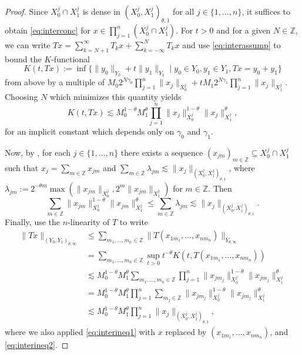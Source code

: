 \documentclass{amsart}
\numberwithin{equation}{section}
\theoremstyle{definition}
\newcommand{\Z}{\mathbb{Z}}
\newcommand {\la}{\lambda}
\begin{document}
\begin{proof}

Since $X_{0}^{j}\cap X_{1}^{j}$ is dense in $(X_{0}^{j},X_{1}^{j})_{\theta,1}$ for all $j\in\{1,\ldots,n\}$, it suffices to obtain \eqref{eq:interconc} for $x\in \prod_{j=1}^{n}(X_{0}^{j}\cap X_{1}^{j})$. For $t>0$ and for a given $N\in\Z$, we can write $Tx=\sum_{k=N+1}^{\infty}T_{k}x+\sum_{k=-\infty}^{N}T_{k}x$ and use \eqref{eq:interassump} to bound the $K$-functional 
\[
K(t,Tx):=\inf\{\|y_{0}\|_{Y_{0}}+t\|y_{1}\|_{Y_{1}}\mid y_{0}\in Y_{0},y_{1}\in Y_{1}, Tx=y_{0}+y_{1}\}
\]
from above by a multiple of $M_{0}2^{N\gamma_{0}}\prod_{j=1}^{n}\|x_{j}\|_{X^{j}_{0}}+tM_{1}2^{N\gamma_{1}}\prod_{j=1}^{n}\|x_{j}\|_{X^{j}_{1}}$. Choosing $N$ which minimizes this quantity yields
\begin{equation}\label{eq:interineq1}
K(t,Tx)\lesssim M_{0}^{1-\theta}M_{1}^{\theta}\prod_{j=1}^{n}\|x_{j}\|_{X^{j}_{0}}^{1-\theta}\|x_{j}\|_{X^{j}_{1}}^{\theta},
\end{equation}
for an implicit constant which depends only on $\gamma_{0}$ and $\gamma_{1}$.

Now, by \cite[Lemma 3.2.3 and Theorem 3.3.1]{Bergh-Lofstrom76}, for each $j\in\{1,\ldots,n\}$ there exists a sequence $(x_{jm})_{m\in\Z}\subseteq X_{0}^{j}\cap X^{j}_{1}$ such that $x_{j}=\sum_{m\in\Z}x_{jm}$ and $\sum_{m\in\Z}\la_{jm}\lesssim \|x_{j}\|_{(X_{0}^{j},X_{1}^{j})_{\theta,1}}$, where $\lambda_{jm}:=2^{-\theta m}\max(\|x_{jm}\|_{X^{j}_{0}},2^{m}\|x_{jm}\|_{X_{1}^{j}})$ for $m\in\Z$. Then 
\begin{equation}\label{eq:interineq2}
\sum_{m\in\Z}\|x_{jm}\|_{X^{j}_{0}}^{1-\theta}\|x_{jm}\|_{X^{j}_{1}}^{\theta}\leq \sum_{m\in\Z}\la_{jm}\lesssim \|x_{j}\|_{(X_{0}^{j},X_{1}^{j})_{\theta,1}}.
\end{equation}
Finally, use the $n$-linearity of $T$ to write
\begin{align*}
\|Tx\|_{(Y_{0},Y_{1})_{\theta,\infty}}&\leq \sum_{m_{1},\ldots,m_{n}\in\Z}\|T(x_{1m_{1}},\ldots,x_{nm_{n}})\|_{\overline{Y}_{\theta,\infty}}\\
&=\sum_{m_{1},\ldots,m_{n}\in\Z}\sup_{t>0}t^{-\theta}K(t,T(x_{1m_{1}},\ldots,x_{nm_{n}}))\\
&\lesssim M_{0}^{1-\theta}M_{1}^{\theta}\sum_{m_{1},\ldots,m_{n}\in\Z}\prod_{j=1}^{n}\|x_{jm_{j}}\|_{X^{j}_{0}}^{1-\theta}\|x_{jm_{j}}\|_{X^{j}_{1}}^{\theta}\\
&= M_{0}^{1-\theta}M_{1}^{\theta}\prod_{j=1}^{n}\sum_{m_{j}\in\Z}\|x_{jm_{j}}\|_{X^{j}_{0}}^{1-\theta}\|x_{jm_{j}}\|_{X^{j}_{1}}^{\theta}\\
&\lesssim M_{0}^{1-\theta}M_{1}^{\theta}\prod_{j=1}^{n}\|x_{j}\|_{(X_{0}^{j},X_{1}^{j})_{\theta,1}},
\end{align*}
where we also applied \eqref{eq:interineq1} with $x$ replaced by $(x_{1m_{1}},\ldots,x_{nm_{n}})$, and \eqref{eq:interineq2}. 
\end{proof}
\end{document}
